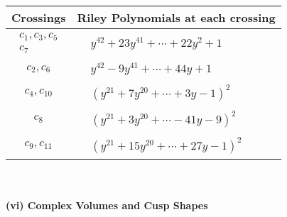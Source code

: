 \documentclass[1p]{elsarticle_modified}
\theoremstyle{definition}
\begin{document}
\begin{tabular}{m{50pt}|m{274pt}}
Crossings & \hspace{64pt}Riley Polynomials at each crossing \\
\hline $$\begin{aligned}c_{1},c_{3},c_{5}\\c_{7}\end{aligned}$$&$\begin{aligned}
&y^{42}+23 y^{41}+\cdots+22 y^2+1
\end{aligned}$\\
\hline $$\begin{aligned}c_{2},c_{6}\end{aligned}$$&$\begin{aligned}
&y^{42}-9 y^{41}+\cdots+44 y+1
\end{aligned}$\\
\hline $$\begin{aligned}c_{4},c_{10}\end{aligned}$$&$\begin{aligned}
&(y^{21}+7 y^{20}+\cdots+3 y-1)^{2}
\end{aligned}$\\
\hline $$\begin{aligned}c_{8}\end{aligned}$$&$\begin{aligned}
&(y^{21}+3 y^{20}+\cdots-41 y-9)^{2}
\end{aligned}$\\
\hline $$\begin{aligned}c_{9},c_{11}\end{aligned}$$&$\begin{aligned}
&(y^{21}+15 y^{20}+\cdots+27 y-1)^{2}
\end{aligned}$\\
\hline
\end{tabular}\\~\\
\newpage\flushleft \textbf{(vi) Complex Volumes and Cusp Shapes}
\end{document}
